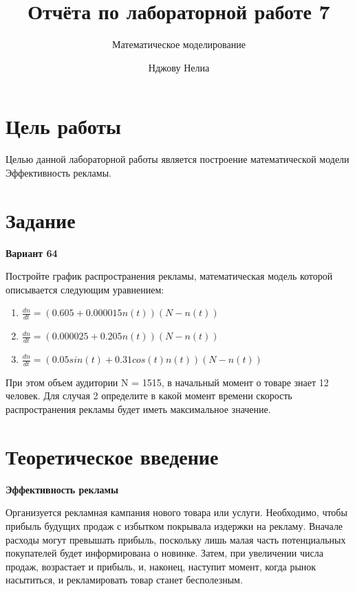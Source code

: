 \documentclass[
  12pt,
  a4paper,
  DIV=11,
  numbers=noendperiod]{scrreprt}
\title{Отчёта по лабораторной работе 7}
\subtitle{Математическое моделирование}
\author{Нджову Нелиа}
\date{}
\renewcommand*\contentsname{Содержание}
\newcommand\contentsname{Содержание}
\begin{document}
\maketitle

\renewcommand*\contentsname{Содержание}
{
\setcounter{tocdepth}{1}
\tableofcontents
}
\listoffigures
\listoftables
{}
\chapter{Цель
работы}\label{ux446ux435ux43bux44c-ux440ux430ux431ux43eux442ux44b}

Целью данной лабораторной работы является построение математической
модели Эффективность рекламы.

\chapter{Задание}\label{ux437ux430ux434ux430ux43dux438ux435}

\textbf{Вариант 64}

Постройте график распространения рекламы, математическая модель которой
описывается следующим уравнением:

\begin{enumerate}
\def\labelenumi{\arabic{enumi}.}
\item
  \(\frac{dn}{dt} = (0.605 + 0.000015n(t))(N - n(t))\)
\item
  \(\frac{dn}{dt} = (0.000025 + 0.205n(t))(N - n(t))\)
\item
  \(\frac{dn}{dt} = (0.05sin(t) + 0.31cos(t)n(t))(N - n(t))\)
\end{enumerate}

При этом объем аудитории N = 1515, в начальный момент о товаре знает 12
человек. Для случая 2 определите в какой момент времени скорость
распространения рекламы будет иметь максимальное значение.

\chapter{Теоретическое
введение}\label{ux442ux435ux43eux440ux435ux442ux438ux447ux435ux441ux43aux43eux435-ux432ux432ux435ux434ux435ux43dux438ux435}

\textbf{Эффективность рекламы}

Организуется рекламная кампания нового товара или услуги. Необходимо,
чтобы прибыль будущих продаж с избытком покрывала издержки на рекламу.
Вначале расходы могут превышать прибыль, поскольку лишь малая часть
потенциальных покупателей будет информирована о новинке. Затем, при
увеличении числа продаж, возрастает и прибыль, и, наконец, наступит
момент, когда рынок насытиться, и рекламировать товар станет
бесполезным.
\end{document}
